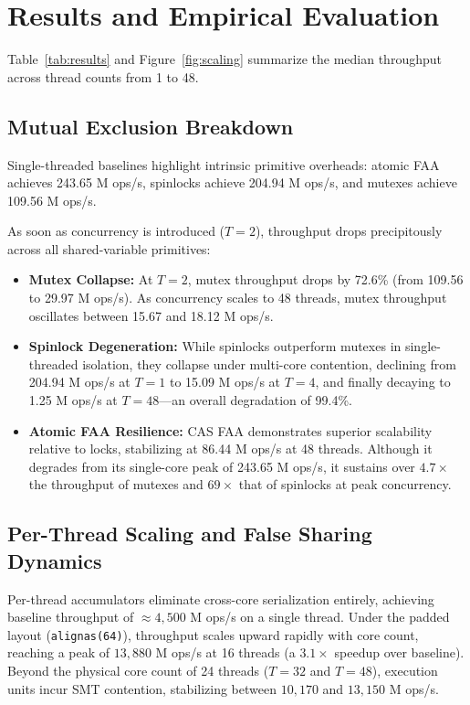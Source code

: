 \documentclass[conference]{IEEEtran}
\begin{document}
\section{Results and Empirical Evaluation}

Table~\ref{tab:results} and Figure~\ref{fig:scaling} summarize the median throughput across thread counts from 1 to 48.

\subsection{Mutual Exclusion Breakdown}
Single-threaded baselines highlight intrinsic primitive overheads: atomic FAA achieves 243.65 M ops/s, spinlocks achieve 204.94 M ops/s, and mutexes achieve 109.56 M ops/s. 

As soon as concurrency is introduced ($T = 2$), throughput drops precipitously across all shared-variable primitives:
\begin{itemize}
    \item \textbf{Mutex Collapse:} At $T = 2$, mutex throughput drops by 72.6\% (from 109.56 to 29.97 M ops/s). As concurrency scales to 48 threads, mutex throughput oscillates between 15.67 and 18.12 M ops/s.
    \item \textbf{Spinlock Degeneration:} While spinlocks outperform mutexes in single-threaded isolation, they collapse under multi-core contention, declining from 204.94 M ops/s at $T=1$ to 15.09 M ops/s at $T=4$, and finally decaying to 1.25 M ops/s at $T=48$---an overall degradation of 99.4\%.
    \item \textbf{Atomic FAA Resilience:} CAS FAA demonstrates superior scalability relative to locks, stabilizing at 86.44 M ops/s at 48 threads. Although it degrades from its single-core peak of 243.65 M ops/s, it sustains over $4.7\times$ the throughput of mutexes and $69\times$ that of spinlocks at peak concurrency.
\end{itemize}

\subsection{Per-Thread Scaling and False Sharing Dynamics}
Per-thread accumulators eliminate cross-core serialization entirely, achieving baseline throughput of $\approx 4,500$ M ops/s on a single thread. 
Under the padded layout (\texttt{alignas(64)}), throughput scales upward rapidly with core count, reaching a peak of $13,880$ M ops/s at 16 threads (a $3.1\times$ speedup over baseline). Beyond the physical core count of 24 threads ($T = 32$ and $T = 48$), execution units incur SMT contention, stabilizing between $10,170$ and $13,150$ M ops/s.
\end{document}
